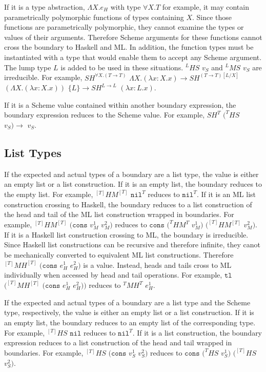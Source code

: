 If it is a type abstraction, $\Lambda X.e_{H}$ with type $\forall X.T$ for example, it may contain parametrically polymorphic functions of types containing $X$.  Since those functions are parametrically polymorphic, they cannot examine the types or values of their arguments.  Therefore Scheme arguments for these functions cannot cross the boundary to Haskell and ML.  In addition, the function types must be instantiated with a type that would enable them to accept any Scheme argument.  The lump type $L$ is added to be used in these situations.  $^{L}HS$ $v_{S}$ and $^{L}MS$ $v_{S}$ are irreducible.  For example, $SH^{\forall X.(T\rightarrow T)}$ $\Lambda X.(\lambda x:X.x)\rightarrow SH^{(T\rightarrow T)[L/X]}$ $(\Lambda X.(\lambda x:X.x))$ $\lbrace L\rbrace\rightarrow SH^{L\rightarrow L}$ $(\lambda x:L.x)$.

If it is a Scheme value contained within another boundary expression, the boundary expression reduces to the Scheme value.  For example, $SH^{T}$ $(^{T}HS$ $v_{S})\rightarrow$ $v_{S}$.

\subsection{List Types}

If the expected and actual types of a boundary are a list type, the value is either an empty list or a list construction.  If it is an empty list, the boundary reduces to the empty list.  For example, $^{[T]}HM^{[T]}$ $\mathtt{nil}^{T}$ reduces to $\mathtt{nil}^{T}$.  If it is an ML list construction crossing to Haskell, the boundary reduces to a list construction of the head and tail of the ML list construction wrapped in boundaries.  For example, $^{[T]}HM^{[T]}$ $(\mathtt{cons}$ $v_{M}^{1}$ $v_{M}^{2})$ reduces to $\mathtt{cons}$ $(^{T}HM^{T}$ $v_{M}^{1})$ $(^{[T]}HM^{[T]}$ $v_{M}^{2})$.  If it is a Haskell list construction crossing to ML, the boundary is irreducible.  Since Haskell list constructions can be recursive and therefore infinite, they canot be mechanically converted to equivalent ML list constructions.  Therefore $^{[T]}MH^{[T]}$ $(\mathtt{cons}$ $e_{H}^{1}$ $e_{H}^{2})$ is a value.  Instead, heads and tails cross to ML individually when accessed by head and tail operations.  For example, $\mathtt{tl}$ $(^{[T]}MH^{[T]}$ $(\mathtt{cons}$ $e_{H}^{1}$ $e_{H}^{2}))$ reduces to $^{T}MH^{T}$ $e_{H}^{1}$.

If the expected and actual types of a boundary are a list type and the Scheme type, respectively, the value is either an empty list or a list construction.  If it is an empty list, the boundary reduces to an empty list of the corresponding type.  For example, $^{[T]}HS$ $\mathtt{nil}$ reduces to $\mathtt{nil}^{T}$.  If it is a list construction, the boundary expression reduces to a list construction of the head and tail wrapped in boundaries.  For example, $^{[T]}HS$ $(\mathtt{cons}$ $v_{S}^{1}$ $v_{S}^{2})$ reduces to $\mathtt{cons}$ $(^{T}HS$ $v_{S}^{1})$ $(^{[T]}HS$ $v_{S}^{2})$.

